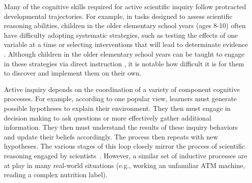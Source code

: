 \documentclass[10pt,letterpaper]{article}
\begin{document}

Many of the cognitive skills required for active scientific inquiry follow protracted developmental trajectories. For example, in tasks designed to assess scientific reasoning abilities, children in the older elementary school years (ages 8-10) often have difficulty adopting systematic strategies, such as testing the effects of one variable at a time or selecting interventions that will lead to determinate evidence \cite{Chen:1999}. Although children in the older elementary school years can be taught to engage in these strategies via direct instruction \cite{Klahr:2004,Kuhn:2005}, it is notable how difficult it is for them to discover and implement them on their own. 

Active inquiry depends on the coordination of a variety of component cognitive processes.  For example, according to one popular view, learners must generate possible hypotheses to explain their environment.  They then must engage in decision making to ask questions or more effectively gather additional information.  They then must understand the results of these inquiry behaviors and update their beliefs accordingly.  The process then repeats with new hypotheses.  The various stages of this loop closely mirror the process of scientific reasoning engaged by scientists~\cite{Russell:1993,Klein:2006a,Klein:2006b}. However, a similar set of inductive processes are at play in many real-world situations (e.g., working an unfamiliar ATM machine, reading a complex nutrition label).
\end{document}
